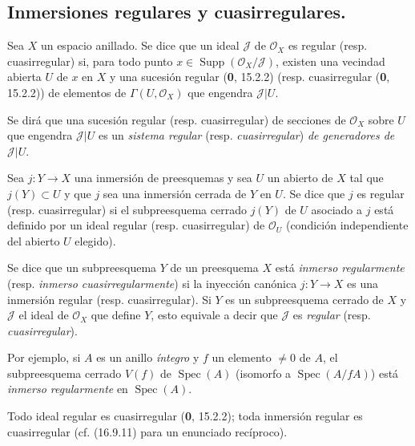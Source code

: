 \subsection{Inmersiones regulares y cuasirregulares.}
\label{IV.16.9}

\begin{definition}[16.9.1]
\label{IV.16.9.1}
Sea $X$ un espacio anillado. Se dice que un ideal $\mathscr J$ de
$\mathcal{O}_X$ es regular \textup{(resp.} cuasirregular\textup{)} si, para todo
punto $x\in\operatorname{Supp}(\mathcal{O}_X/\mathscr J)$, existen una
vecindad abierta $U$ de $x$ en $X$ y una sucesión regular \textup{(\textbf 0, 15.2.2) (resp.}
cuasirregular \textup{(\textbf 0, 15.2.2))} de elementos de $\Gamma(U,\mathcal{O}_X)$ que
engendra $\mathscr J|U$.
\end{definition}

Se dirá que una sucesión regular (resp. cuasirregular) de secciones de
$\mathcal{O}_X$ sobre $U$ que engendra $\mathscr J|U$ es un
\emph{sistema regular} (resp. \emph{cuasirregular}) \emph{de generadores
de} $\mathscr J|U$.

\begin{definition}[16.9.2]
\label{IV.16.9.2}
Sea $j:Y\to X$ una inmersión de preesquemas y sea $U$ un abierto de $X$ tal
que $j(Y)\subset U$ y que $j$ sea una inmersión cerrada de $Y$ en $U$. Se
dice que $j$ es regular \textup{(resp.} cuasirregular\textup{)} si el
subpreesquema cerrado $j(Y)$ de $U$ asociado a $j$ está definido por un ideal
regular \textup{(resp.} cuasirregular\textup{)} de $\mathcal{O}_U$ \textup{(condición independiente del
abierto $U$ elegido)}.
\end{definition}

Se dice que un subpreesquema $Y$ de un preesquema $X$ está \emph{inmerso
regularmente} (resp. \emph{inmerso cuasirregularmente}) si la inyección
canónica $j:Y\to X$ es una inmersión regular (resp. cuasirregular). Si $Y$ es
un subpreesquema cerrado de $X$ y $\mathscr J$ el ideal de $\mathcal{O}_X$
que define $Y$, esto equivale a decir que $\mathscr J$ es \emph{regular}
(resp. \emph{cuasirregular}).

Por ejemplo, si $A$ es un anillo \emph{íntegro} y $f$ un elemento $\neq0$ de
$A$, el subpreesquema cerrado $V(f)$ de $\operatorname{Spec}(A)$ (isomorfo a
$\operatorname{Spec}(A/fA)$) está \emph{inmerso regularmente} en
$\operatorname{Spec}(A)$.

Todo ideal regular es cuasirregular (\textbf 0, 15.2.2); toda inmersión regular es
cuasirregular (cf. (16.9.11) para un enunciado recíproco).

